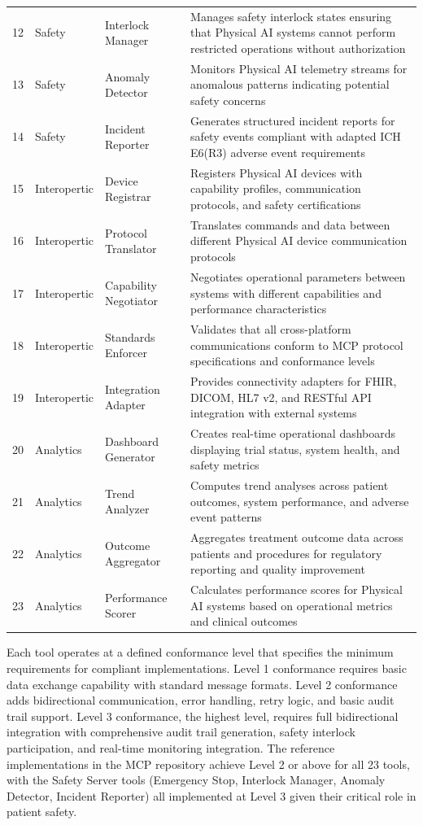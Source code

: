 \begin{longtable}{c l l p{6.5cm}}
12 & Safety & Interlock Manager & Manages safety interlock states ensuring that Physical AI systems cannot perform restricted operations without authorization \\
13 & Safety & Anomaly Detector & Monitors Physical AI telemetry streams for anomalous patterns indicating potential safety concerns \\
14 & Safety & Incident Reporter & Generates structured incident reports for safety events compliant with adapted ICH E6(R3) adverse event requirements \\
\midrule
15 & Interopertic & Device Registrar & Registers Physical AI devices with capability profiles, communication protocols, and safety certifications \\
16 & Interopertic & Protocol Translator & Translates commands and data between different Physical AI device communication protocols \\
17 & Interopertic & Capability Negotiator & Negotiates operational parameters between systems with different capabilities and performance characteristics \\
18 & Interopertic & Standards Enforcer & Validates that all cross-platform communications conform to MCP protocol specifications and conformance levels \\
19 & Interopertic & Integration Adapter & Provides connectivity adapters for FHIR, DICOM, HL7 v2, and RESTful API integration with external systems \\
\midrule
20 & Analytics & Dashboard Generator & Creates real-time operational dashboards displaying trial status, system health, and safety metrics \\
21 & Analytics & Trend Analyzer & Computes trend analyses across patient outcomes, system performance, and adverse event patterns \\
22 & Analytics & Outcome Aggregator & Aggregates treatment outcome data across patients and procedures for regulatory reporting and quality improvement \\
23 & Analytics & Performance Scorer & Calculates performance scores for Physical AI systems based on operational metrics and clinical outcomes \\
\end{longtable}

Each tool operates at a defined conformance level that specifies the minimum
requirements for compliant implementations. Level 1 conformance requires basic
data exchange capability with standard message formats. Level 2 conformance
adds bidirectional communication, error handling, retry logic, and basic audit
trail support. Level 3 conformance, the highest level, requires full
bidirectional integration with comprehensive audit trail generation, safety
interlock participation, and real-time monitoring integration. The reference
implementations in the MCP repository \cite{mcp-repo} achieve Level 2 or above
for all 23 tools, with the Safety Server tools (Emergency Stop, Interlock
Manager, Anomaly Detector, Incident Reporter) all implemented at Level 3 given
their critical role in patient safety.


